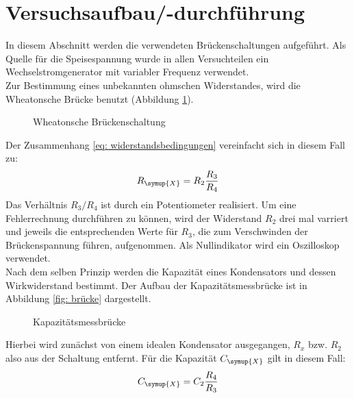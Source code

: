 \section{Versuchsaufbau/-durchführung}\label{abs: aufbau}
In diesem Abschnitt werden die verwendeten Brückenschaltungen aufgeführt. Als Quelle für
die Speisespannung wurde in allen Versuchteilen ein Wechselstromgenerator mit variabler Frequenz
verwendet. \\
Zur Bestimmung eines unbekannten ohmschen Widerstandes, wird die Wheatonsche Brücke
benutzt (Abbildung \ref{fig: wheaton}).
\begin{figure}
  \centering
  \caption{Wheatonsche Brückenschaltung\cite{anleitung302}}
  \label{fig: wheaton}
\end{figure}
Der Zusammenhang \eqref{eq: widerstandsbedingungen} vereinfacht sich in diesem Fall zu:
\begin{equation}
  R_{\symup{X}} = R_2 \frac{R_3}{R_4}
\end{equation}
Das Verhältnis $R_3 / R_4$ ist durch ein Potentiometer realisiert. Um eine Fehlerrechnung durchführen
zu können, wird der Widerstand $R_2$ drei mal varriert und jeweils die entsprechenden Werte für $R_3$, die
zum Verschwinden der Brückenspannung führen, aufgenommen. Als Nullindikator wird ein Oszilloskop verwendet. \\
Nach dem selben Prinzip werden die Kapazität eines Kondensators und dessen Wirkwiderstand bestimmt. Der Aufbau
der Kapazitätsmessbrücke ist in Abbildung \ref{fig: brücke} dargestellt.
\begin{figure}
  \centering
  \caption{Kapazitätsmessbrücke\cite{anleitung302}}
  \label{fig: kapazität}
\end{figure}
Hierbei wird zunächst von einem idealen Kondensator ausgegangen, $R_x$ bzw. $R_2$ also aus der Schaltung entfernt. Für die
Kapazität $C_{\symup{X}}$ gilt in diesem Fall:
\begin{equation}
  C_{\symup{X}} = C_2 \frac{R_4}{R_3}
  \label{eq: Cx}
\end{equation}
